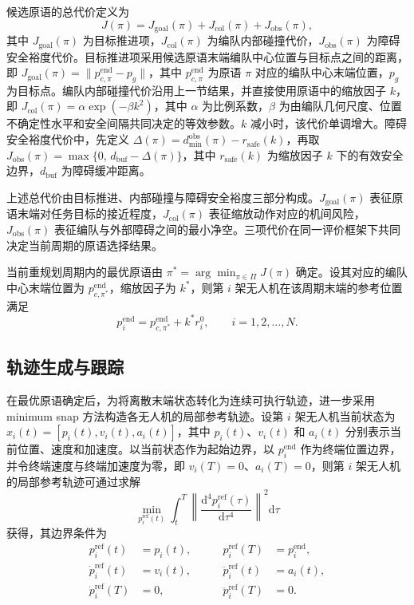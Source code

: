 候选原语的总代价定义为
\[
J(\pi) = J_{\mathrm{goal}}(\pi) + J_{\mathrm{col}}(\pi) + J_{\mathrm{obs}}(\pi),
\]
其中 $J_{\mathrm{goal}}(\pi)$ 为目标推进项，$J_{\mathrm{col}}(\pi)$ 为编队内部碰撞代价，$J_{\mathrm{obs}}(\pi)$ 为障碍安全裕度代价。目标推进项采用候选原语末端编队中心位置与目标点之间的距离，即 $J_{\mathrm{goal}}(\pi)=\|p_{c,\pi}^{\mathrm{end}} - p_{g}\|$，其中 $p_{c,\pi}^{\mathrm{end}}$ 为原语 $\pi$ 对应的编队中心末端位置，$p_{g}$ 为目标点。编队内部碰撞代价沿用上一节结果，并直接使用原语中的缩放因子 $k$，即 $J_{\mathrm{col}}(\pi)=\alpha \exp(-\beta k^{2})$，其中 $\alpha$ 为比例系数，$\beta$ 为由编队几何尺度、位置不确定性水平和安全间隔共同决定的等效参数。$k$ 减小时，该代价单调增大。障碍安全裕度代价中，先定义 $\Delta(\pi)=d_{\min}^{\mathrm{obs}}(\pi)-r_{\mathrm{safe}}(k)$，再取 $J_{\mathrm{obs}}(\pi)=\max\{0,\, d_{\mathrm{buf}}-\Delta(\pi)\}$，其中 $r_{\mathrm{safe}}(k)$ 为缩放因子 $k$ 下的有效安全边界，$d_{\mathrm{buf}}$ 为障碍缓冲距离。

上述总代价由目标推进、内部碰撞与障碍安全裕度三部分构成。$J_{\mathrm{goal}}(\pi)$ 表征原语末端对任务目标的接近程度，$J_{\mathrm{col}}(\pi)$ 表征缩放动作对应的机间风险，$J_{\mathrm{obs}}(\pi)$ 表征编队与外部障碍之间的最小净空。三项代价在同一评价框架下共同决定当前周期的原语选择结果。

当前重规划周期内的最优原语由 $\pi^{*} = \arg\min_{\pi\in\Pi} J(\pi)$ 确定。设其对应的编队中心末端位置为 $p_{c,\pi^{*}}^{\mathrm{end}}$，缩放因子为 $k^{*}$，则第 $i$ 架无人机在该周期末端的参考位置满足
\[
p_{i}^{\mathrm{end}} = p_{c,\pi^{*}}^{\mathrm{end}} + k^{*} r_{i}^{0}, \qquad i=1,2,\ldots,N.
\]

\subsection{轨迹生成与跟踪}

在最优原语确定后，为将离散末端状态转化为连续可执行轨迹，进一步采用 minimum snap 方法构造各无人机的局部参考轨迹。设第 $i$ 架无人机当前状态为 $x_{i}(t) = [p_{i}(t), v_{i}(t), a_{i}(t)]$，其中 $p_{i}(t)$、$v_{i}(t)$ 和 $a_{i}(t)$ 分别表示当前位置、速度和加速度。以当前状态作为起始边界，以 $p_{i}^{\mathrm{end}}$ 作为终端位置边界，并令终端速度与终端加速度为零，即 $v_{i}(T)=0$、$a_{i}(T)=0$，则第 $i$ 架无人机的局部参考轨迹可通过求解
\[
\min_{p_{i}^{\mathrm{ref}}(t)} \int_{t}^{T} \left\|\frac{\mathrm{d}^{4} p_{i}^{\mathrm{ref}}(\tau)}{\mathrm{d}\tau^{4}}\right\|^{2} \mathrm{d}\tau
\]
获得，其边界条件为
\[
\begin{aligned}
p_{i}^{\mathrm{ref}}(t) &= p_{i}(t), \qquad &p_{i}^{\mathrm{ref}}(T) &= p_{i}^{\mathrm{end}},\\
\dot{p}_{i}^{\mathrm{ref}}(t) &= v_{i}(t), \qquad &\ddot{p}_{i}^{\mathrm{ref}}(t) &= a_{i}(t),\\
\dot{p}_{i}^{\mathrm{ref}}(T) &= 0, \qquad &\ddot{p}_{i}^{\mathrm{ref}}(T) &= 0.
\end{aligned}
\]

